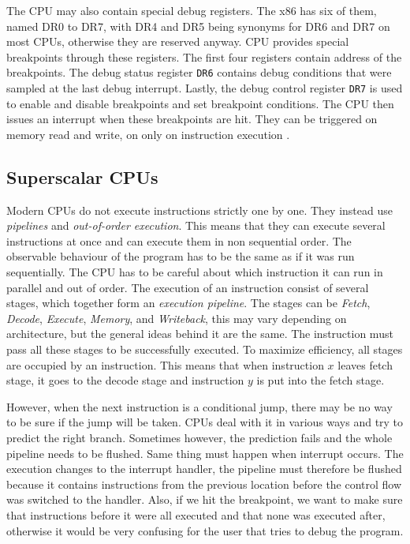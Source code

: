 The CPU may also contain special debug registers. The x86 has six of them,
named DR0 to DR7, with DR4 and DR5 being synonyms for DR6 and DR7 on most CPUs,
otherwise they are reserved anyway. CPU provides special breakpoints through
these registers. The first four registers contain address of the breakpoints.
The debug status register \texttt{DR6} contains debug conditions that were
sampled at the last debug interrupt. Lastly, the debug control register
\texttt{DR7} is used to enable and disable breakpoints and set breakpoint
conditions. The CPU then issues an interrupt when these breakpoints are hit.
They can be triggered on memory read and write, on only on instruction
execution \cite{intel-manual}.

\subsection{Superscalar CPUs}
Modern CPUs do not execute instructions strictly one by one. They instead use
\textit{pipelines} and \textit{out-of-order execution}. This means that they
can execute several instructions at once and can execute them in non sequential
order. The observable behaviour of the program has to be the same as if it was
run sequentially. The CPU has to be careful about which instruction it can run
in parallel and out of order. The execution of an instruction consist of
several stages, which together form an \textit{execution pipeline}. The stages
can be \textit{Fetch}, \textit{Decode}, \textit{Execute}, \textit{Memory}, and
\textit{Writeback}, this may vary depending on architecture, but the general
ideas behind it are the same. The instruction must pass all these stages to be
successfully executed. To maximize efficiency, all stages are occupied by an
instruction. This means that when instruction $x$ leaves fetch stage, it goes
to the decode stage and instruction $y$ is put into the fetch stage.

However, when the next instruction is a conditional jump, there may be no way
to be sure if the jump will be taken.  CPUs deal with it in various ways and
try to predict the right branch. Sometimes however, the prediction fails and
the whole pipeline needs to be flushed. Same thing must happen when interrupt
occurs. The execution changes to the interrupt handler, the pipeline must
therefore be flushed because it contains instructions from the previous
location before the control flow was switched to the handler. Also, if we hit
the breakpoint, we want to make sure that instructions before it were all
executed and that none was executed after, otherwise it would be very confusing
for the user that tries to debug the program.

